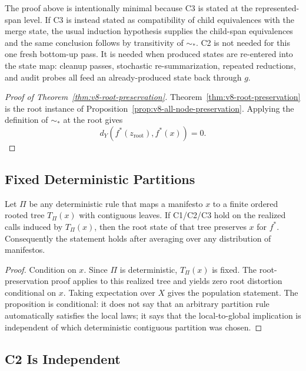The proof above is intentionally minimal because C3 is stated at the
represented-span level. If C3 is instead stated as compatibility of child
equivalences with the merge state, the usual induction hypothesis supplies the
child-span equivalences and the same conclusion follows by transitivity of
\(\sim_\ast\). C2 is not needed for this one fresh bottom-up pass. It is needed
when produced states are re-entered into the state map: cleanup passes,
stochastic re-summarization, repeated reductions, and audit probes all feed an
already-produced state back through \(g\).

\begin{proof}[Proof of Theorem~\ref{thm:v8-root-preservation}]
Theorem~\ref{thm:v8-root-preservation} is the root instance of
Proposition~\ref{prop:v8-all-node-preservation}. Applying the definition of
\(\sim_\ast\) at the root gives
\[
  d_Y\!\left(f^\ast(z_{\mathrm{root}}),f^\ast(x)\right)=0 .
\]
\end{proof}

\subsection{Fixed Deterministic Partitions}
\label{app:v8-fixed-partition}

\begin{proposition}
\label{prop:v8-fixed-partition}
Let \(\Pi\) be any deterministic rule that maps a manifesto \(x\) to a finite
ordered rooted tree \(T_\Pi(x)\) with contiguous leaves. If C1/C2/C3 hold on
the realized calls induced by \(T_\Pi(x)\), then the root state of that tree
preserves \(x\) for \(f^\ast\). Consequently the statement holds after
averaging over any distribution of manifestos.
\end{proposition}

\begin{proof}
Condition on \(x\). Since \(\Pi\) is deterministic, \(T_\Pi(x)\) is fixed.
The root-preservation proof applies to this realized tree and yields zero
root distortion conditional on \(x\). Taking expectation over \(X\) gives the
population statement. The proposition is conditional: it does not say that an
arbitrary partition rule automatically satisfies the local laws; it says that
the local-to-global implication is independent of which deterministic
contiguous partition was chosen.
\end{proof}

\subsection{C2 Is Independent}
\label{app:v8-c2-counterexample}


